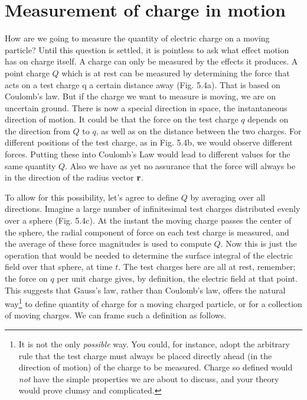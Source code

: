 \section{Measurement of charge in motion}

How are we going to measure the quantity of electric charge on a
moving particle? Until this question is settled, it is pointless to ask
what effect motion has on charge itself. A charge can only be measured
by the effects it produces. A point charge $Q$ which is at rest can
be measured by determining the force that acts on a test charge q a
certain distance away (Fig. 5.4a). That is based on Coulomb's law.
But if the charge we want to measure is moving, we are on uncertain
ground. There is now a special direction in space, the instantaneous
direction of motion. It could be that the force on the test charge $q$
depends on the direction from $Q$ to $q$, as well as on the distance between
the two charges. For different positions of the test charge, as
in Fig. 5.4b, we would observe different forces. Putting these into
Coulomb's Law would lead to different values for the same quantity
$Q$. Also we have as yet no assurance that the force will always
be in the direction of the radius vector $\mathbf{r}$.

To allow for this possibility, let's agree to define $Q$ by averaging
over all directions. Imagine a large number of infinitesimal test
charges distributed evenly over a sphere (Fig. 5.4c). At the instant
the moving charge passes the center of the sphere, the radial component
of force on each test charge is measured, and the average of these
force magnitudes is used to compute $Q$. Now this is just the operation
that would be needed to determine the surface integral of the
electric field over that sphere, at time $t$. The test charges here are all
at rest, remember; the force on $q$ per unit charge gives, by definition,
the electric field at that point. This suggests that Gauss's law, rather
than Coulomb's law, offers the natural 
way\footnote{It is not the only \emph{possible} way. You could, for instance, adopt the arbitrary rule that
the test charge must always be placed directly ahead (in the direction of motion) of the
charge to be measured. Charge so defined would \emph{not} have the simple properties we are
about to discuss, and your theory would prove clumsy and complicated.} to define quantity of
charge for a moving charged particle, or for a collection of moving
charges. We can frame such a definition as follows.

